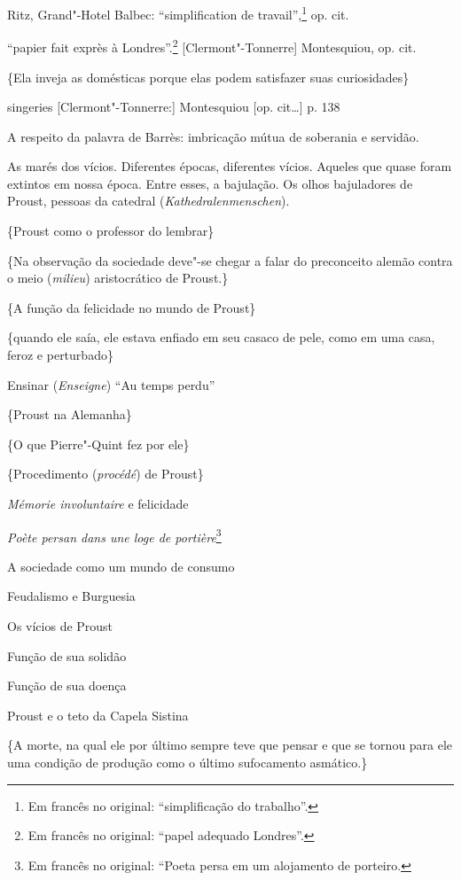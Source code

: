 Ritz, Grand"-Hotel Balbec: ``simplification de travail'',\footnote{Em francês no original: ``simplificação do trabalho''. \versal{[N. T.]}} op. cit.

``papier fait exprès à Londres''.\footnote{Em francês no original: ``papel adequado
  Londres''. \versal{[N. T.]}} {[}Clermont"-Tonnerre{]} Montesquiou, op. cit.

\{Ela inveja as domésticas porque elas podem satisfazer suas
curiosidades\}

singeries {[}Clermont"-Tonnerre:{]} Montesquiou {[}op. cit\ldots{}{]} p. 138

A respeito da palavra de Barrès: imbricação mútua de soberania e
servidão.

As marés dos vícios. Diferentes épocas, diferentes vícios. Aqueles que
quase foram extintos em nossa época. Entre esses, a bajulação. Os olhos
bajuladores de Proust, pessoas da catedral (\emph{Kathedralenmenschen}).

\{Proust como o professor do lembrar\}

\{Na observação da sociedade deve"-se chegar a falar do preconceito
alemão contra o meio (\emph{milieu}) aristocrático de Proust.\}

\{A função da felicidade no mundo de Proust\}

\{quando ele saía, ele estava enfiado em seu casaco de pele, como em uma
casa, feroz e perturbado\}

Ensinar (\emph{Enseigne}) ``Au temps perdu''

\{Proust na Alemanha\}

\{O que Pierre"-Quint fez por ele\}

\{Procedimento (\emph{procédé}) de Proust\}

\emph{Mémorie involuntaire} e felicidade

\emph{Poète persan dans une loge de portière}\footnote{Em francês no original: ``Poeta
  persa em um alojamento de porteiro. \versal{[N. T.]}}

A sociedade como um mundo de consumo

Feudalismo e Burguesia

Os vícios de Proust

Função de sua solidão

Função de sua doença

Proust e o teto da Capela Sistina

\{A morte, na qual ele por último sempre teve que pensar e que se tornou
para ele uma condição de produção como o último sufocamento asmático.\}

